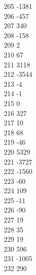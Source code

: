{ 205	-1381 \\
 206	-457 \\
 207	340 \\
 208	-158 \\
 209	2 \\
 210	67 \\
 211	3118 \\
 212	-3544 \\
 213	-4 \\
 214	-1 \\
 215	0 \\
 216	327 \\
 217	10 \\
 218	68 \\
 219	-46 \\
 220	5329 \\
 221	-3727 \\
 222	-1560 \\
 223	-60 \\
 224	109 \\
 225	-11 \\
 226	-90 \\
 227	19 \\
 228	35 \\
 229	19 \\
 230	596 \\
 231	-1005 \\
 232	290 \\
}
